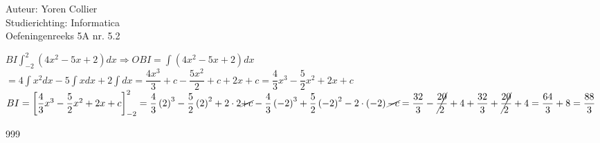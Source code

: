 \documentclass[a4paper]{article}
\newcommand{\adR}{\Rightarrow} %
\newcommand{\Lh}{\left(} %
\newcommand{\Rh}{\right)}
\newcommand{\Lv}{\left[} %
\newcommand{\Rv}{\right]}
\newcommand{\schrap}{\cancel}
\newcommand{\intgrl}{\displaystyle\int} %
\begin{document}
\noindent \large Auteur: Yoren Collier \\
\noindent \large Studierichting: Informatica\\
\noindent \large Oefeningenreeks 5A nr. 5.2\\

\medskip

\normalsize

$ BI \intgrl_{-2}^2 \Lh 4x^2 -5x +2 \Rh dx \adR OBI = \intgrl \Lh 4x^2 -5x +2 \Rh dx$\\

$= 4\intgrl x^2 dx -5 \intgrl x dx +2 \intgrl dx = \dfrac{4 x^3}{3} +c -\dfrac{5x^2}{2} +c +2x +c = \dfrac{4}{3} x^3 - \dfrac{5}{2} x^2 +2x +c $\\

$BI = \Lv \dfrac{4}{3} x^3 - \dfrac{5}{2} x^2 +2x +c \Rv_{-2}^2 = \dfrac{4}{3} \Lh 2 \Rh^3 - \dfrac{5}{2} \Lh 2 \Rh^2 + 2 \cdot 2 \schrap{+c} - \dfrac{4}{3} \Lh -2 \Rh^3 + \dfrac{5}{2} \Lh -2 \Rh^2 -2 \cdot \Lh -2 \Rh \schrap{-c} = \dfrac{32}{3} - \schrap{\dfrac{20}{2}} +4 + \dfrac{32}{3} + \schrap{\dfrac{20}{2}} +4 = \dfrac{64}{3} +8 = \dfrac{88}{3}$\\

\begin{thebibliography}{999}
\end{thebibliography}
\end{document}
